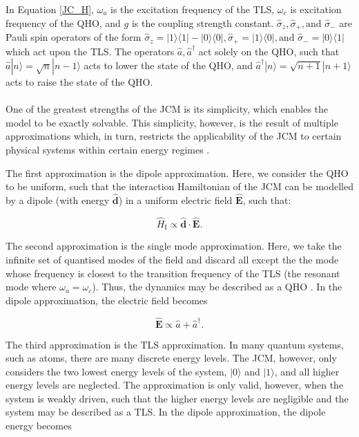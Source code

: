 \documentclass[12pt]{article}
\begin{document}
In Equation \eqref{JC_H}, $\omega_a$ is the excitation frequency of the TLS, $\omega_c$ is excitation frequency of the QHO, and $g$ is the coupling strength constant. $\hat{\sigma}_z, \hat{\sigma}_+, \text{and } \hat{\sigma}_-$ are Pauli spin operators of the form $\hat{\sigma}_z = |1\rangle\langle1| - |0\rangle\langle0|, \hat{\sigma}_+ = |1\rangle\langle0|, \text{and } \hat{\sigma}_- = |0\rangle\langle1|$ which act upon the TLS. The operators $\hat{a}, \hat{a}^\dagger$ act solely on the QHO, such that $\hat{a}|n\rangle = \sqrt{n}|n-1\rangle$ acts to lower the state of the QHO, and $\hat{a}^{\dagger}|n\rangle = \sqrt{n+1}|n+1\rangle$ acts to raise the state of the QHO.\\
\\
One of the greatest strengths of the JCM is its simplicity, which enables the model to be exactly solvable. This simplicity, however, is the result of multiple approximations which, in turn, restricts the applicability of the JCM to certain physical systems within certain energy regimes \cite{General2024-JC_overview}. 

The first approximation is the dipole approximation. Here, we consider the QHO to be uniform, such that the interaction Hamiltonian of the JCM can be modelled by a dipole (with energy $\boldsymbol{\hat{d}}$) in a uniform electric field $\boldsymbol{\hat{E}}$, such that:

\begin{equation*}
    \hat{H}_{\scriptscriptstyle \text{I}} \propto \boldsymbol{\hat{d}} \cdot \boldsymbol{\hat{E}}.
\end{equation*}

The second approximation is the single mode approximation. Here, we take the infinite set of quantised modes of the field and discard all except the the mode whose frequency is closest to the transition frequency of the TLS (the resonant mode where $\omega_a = \omega_c$). Thus, the dynamics may be described as a QHO \cite{General2024-JCM_relevance}. In the dipole approximation, the electric field becomes

\begin{equation*}
    \boldsymbol{\hat{E}}  \propto \hat{a} + \hat{a}^\dagger.
\end{equation*}


The third approximation is the TLS approximation. In many quantum systems, such as atoms, there are many discrete energy levels. The JCM, however, only considers the two lowest energy levels of the system, $|0\rangle$ and $|1\rangle$, and all higher energy levels are neglected. The approximation is only valid, however, when the system is weakly driven, such that the higher energy levels are negligible and the system may be described as a TLS. In the dipole approximation, the dipole energy becomes
\end{document}

